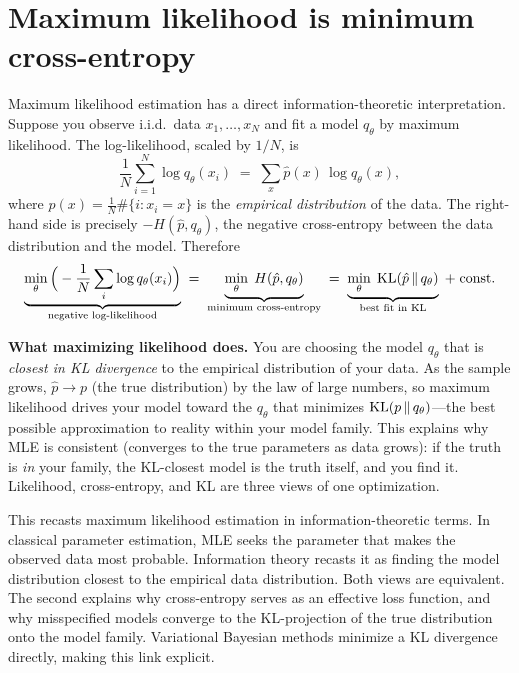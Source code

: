 \section{Maximum likelihood is minimum cross-entropy}
\label{ch33:mle-connection}

Maximum likelihood estimation has a direct information-theoretic interpretation.
Suppose you observe i.i.d.\ data $x_1, \dots, x_N$ and fit a model $q_\theta$ by maximum
likelihood. The log-likelihood, scaled by $1/N$, is
\[
  \frac{1}{N}\sum_{i=1}^N \log q_\theta(x_i)
  \;=\; \sum_{x} \hat p(x)\,\log q_\theta(x),
\]
where $\hat p(x) = \frac1N \#\{i : x_i = x\}$ is the \emph{empirical distribution} of the data. The
right-hand side is precisely $-H(\hat p, q_\theta)$, the negative cross-entropy between the data
distribution and the model. Therefore
\[
  \underbrace{\min_\theta \Big(-\frac1N \sum_i \log q_\theta(x_i)\Big)}_{\text{negative log-likelihood}}
  \;=\;
  \underbrace{\min_\theta\; H(\hat p, q_\theta)}_{\text{minimum cross-entropy}}
  \;=\;
  \underbrace{\min_\theta\; \operatorname{KL}(\hat p \,\|\, q_\theta)}_{\text{best fit in KL}}
  \;+\; \text{const}.
\]

\begin{happeningbox}
\textbf{What maximizing likelihood does.} You are choosing the model $q_\theta$ that
is \emph{closest in KL divergence} to the empirical distribution of your data. As the sample grows,
$\hat p \to p$ (the true distribution) by the law of large numbers, so maximum likelihood drives your
model toward the $q_\theta$ that minimizes $\operatorname{KL}(p\,\|\,q_\theta)$---the best possible approximation to
reality within your model family. This explains why MLE is consistent (converges to the true parameters as data grows): if the truth is \emph{in} your
family, the KL-closest model is the truth itself, and you find it. Likelihood, cross-entropy, and KL are
three views of one optimization.
\end{happeningbox}

\begin{connectionbox}
This recasts maximum likelihood estimation in information-theoretic terms. In classical
parameter estimation, MLE seeks the parameter that makes the observed data most probable.
Information theory recasts it as finding the model distribution closest to the empirical
data distribution. Both views are equivalent. The second explains why cross-entropy serves
as an effective loss function, and why misspecified models converge to the KL-projection of
the true distribution onto the model family. Variational Bayesian methods minimize a KL
divergence directly, making this link explicit.
\end{connectionbox}

